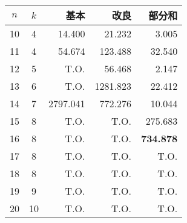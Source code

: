  \centering 
 \begin{tabular}{c|c|r|r|r} \hline
  $n$ & $k$ & 基本 & 改良 & 部分和 \\ \hline
  10 & 4 & 14.400 & 21.232 & 3.005 \\
  11 & 4 & 54.674 & 123.488 & 32.540 \\
  12 & 5 & T.O. & 56.468 & 2.147 \\
  13 & 6 & T.O. & 1281.823 & 22.412 \\  
  14 & 7 & 2797.041 & 772.276 & 10.044 \\   
  15 & 8 & T.O. & T.O. & 275.683 \\  
  16 & 8 & T.O. & T.O. & \textbf{734.878} \\
  17 & 8 & T.O. & T.O. & T.O. \\
  18 & 8 & T.O. & T.O. & T.O. \\
  19 & 9 & T.O. & T.O. & T.O. \\
  20 & 10 & T.O. & T.O. & T.O. \\ \hline
 \end{tabular}